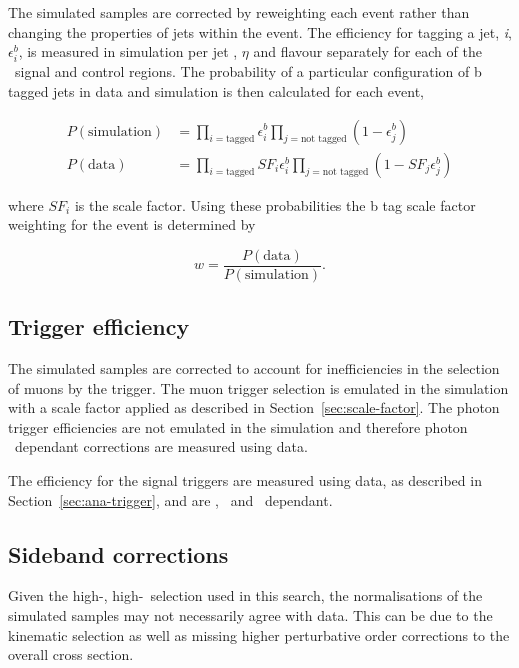 The simulated samples are corrected by reweighting
each event rather than changing the properties of jets within the event. 
The efficiency for tagging a jet, \textit{i}, $\epsilon_{i}^{b}$, is measured in simulation per 
jet \pt, $\eta$ and flavour separately for each of the 
\alphat~signal and control regions. The probability of a particular configuration 
of b tagged jets in data and simulation is then calculated for each event,

\begin{align}
P(\text{simulation}) &= \prod_{i=\text{tagged}} \epsilon^{b}_{i} \prod_{j=\text{not tagged}} (1-\epsilon^{b}_{j})\\
P(\text{data}) &= \prod_{i=\text{tagged}} SF_{i}\epsilon^{b}_{i} \prod_{j=\text{not tagged}} (1-SF_{j}\epsilon^{b}_{j})
\end{align}

where $SF_{i}$ is the scale factor. Using these probabilities the b tag scale factor 
weighting for the event is determined by

\begin{equation}
w = \frac{P(\text{data})}{P(\text{simulation})}.
\end{equation}

\subsection{Trigger efficiency}

The simulated samples are corrected to account for inefficiencies in the selection of muons
by the trigger. The muon trigger selection is emulated in the simulation with a scale factor
applied as described in Section~\ref{sec:scale-factor}. The photon trigger efficiencies
are not emulated in the simulation and therefore photon \pt~dependant corrections are measured 
using data. 

The efficiency for the signal triggers are measured using data, as described 
in Section~\ref{sec:ana-trigger}, and are \scalht, \njet~and \mht~dependant.

\subsection{Sideband corrections}
\label{sec:sideband-corrections}

Given the high-\scalht, high-\etmiss~selection used in this search, 
the normalisations of the simulated samples may not necessarily agree with data. 
This can be due to the kinematic selection as well as missing higher 
perturbative order corrections to the overall cross section. 

